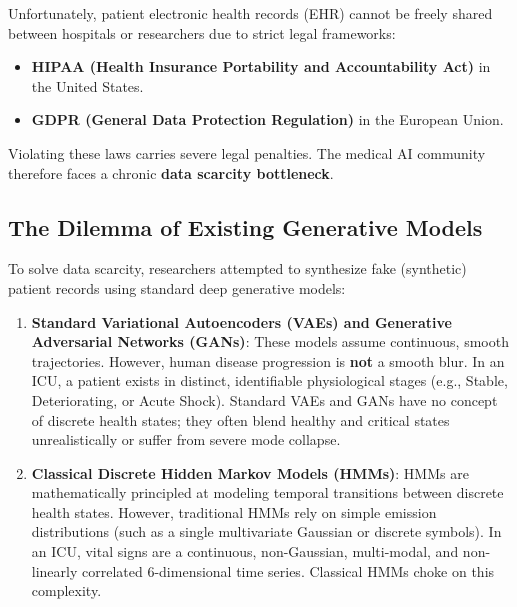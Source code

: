 \documentclass[11pt,a4paper]{article}
\begin{document}
Unfortunately, patient electronic health records (EHR) cannot be freely shared between hospitals or researchers due to strict legal frameworks:
\begin{itemize}
    \item \textbf{HIPAA (Health Insurance Portability and Accountability Act)} in the United States.
    \item \textbf{GDPR (General Data Protection Regulation)} in the European Union.
\end{itemize}
Violating these laws carries severe legal penalties. The medical AI community therefore faces a chronic \textbf{data scarcity bottleneck}.

\subsection{The Dilemma of Existing Generative Models}
To solve data scarcity, researchers attempted to synthesize fake (synthetic) patient records using standard deep generative models:
\begin{enumerate}
    \item \textbf{Standard Variational Autoencoders (VAEs) and Generative Adversarial Networks (GANs)}:
    These models assume continuous, smooth trajectories. However, human disease progression is \textbf{not} a smooth blur. In an ICU, a patient exists in distinct, identifiable physiological stages (e.g., Stable, Deteriorating, or Acute Shock). Standard VAEs and GANs have no concept of discrete health states; they often blend healthy and critical states unrealistically or suffer from severe mode collapse.
    
    \item \textbf{Classical Discrete Hidden Markov Models (HMMs)}:
    HMMs are mathematically principled at modeling temporal transitions between discrete health states. However, traditional HMMs rely on simple emission distributions (such as a single multivariate Gaussian or discrete symbols). In an ICU, vital signs are a continuous, non-Gaussian, multi-modal, and non-linearly correlated 6-dimensional time series. Classical HMMs choke on this complexity.
\end{enumerate}
\end{document}
